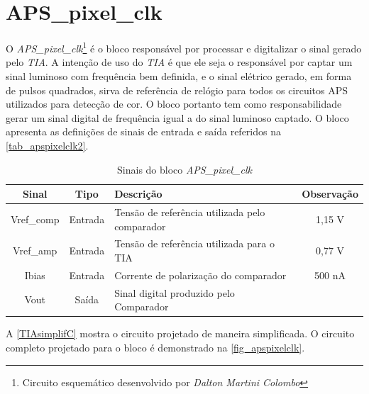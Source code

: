 \renewcommand{\NomeBloco}{\textit{APS\_pixel\_clk}}
\renewcommand{\NomeBlocoNoUnderline}{apspixelclk}
\renewcommand{\NomePTab}{tab_\NomeBlocoNoUnderline}
\renewcommand{\NomeSTab}{tab_\NomeBlocoNoUnderline2}
\renewcommand{\NomePFig}{fig_\NomeBlocoNoUnderline}
\renewcommand{\NomeSFig}{fig_\NomeBlocoNoUnderline2}
\renewcommand{\NomeTTab}{tab_\NomeBlocoNoUnderline3}
\renewcommand{\NomeQTab}{tab_\NomeBlocoNoUnderline4}

\section{APS\_pixel\_clk}

O \NomeBloco{}\footnote{Circuito esquemático desenvolvido por \textit{Dalton Martini Colombo}} \'e o bloco respons\'avel por processar e digitalizar o sinal gerado pelo \textit{TIA}. A intenção de uso do \textit{TIA} \'e que ele seja o respons\'avel por captar um sinal luminoso com frequ\^encia bem definida, e o sinal el\'etrico gerado, em forma de pulsos quadrados, sirva de refer\^encia de rel\'ogio para todos os circuitos APS utilizados para detecção de cor. O bloco portanto tem como responsabilidade gerar um sinal digital de frequ\^encia igual a do sinal luminoso captado. O bloco apresenta as definições de sinais de entrada e sa\'ida referidos na \autoref{\NomeSTab}.

\begin{table}[!h]
\caption{Sinais do bloco \NomeBloco}
\label{\NomeSTab}
\centering
\begin{tabular}{cclc}

    \toprule
    Sinal & Tipo    & Descrição  & Observação\\
    \midrule \midrule
    Vref\_comp   & Entrada   & Tensão de refer\^encia utilizada pelo comparador &  1,15 V\\
    \midrule
    Vref\_amp   & Entrada   & Tensão de refer\^encia utilizada para o TIA &  0,77 V\\
    \midrule
    Ibias   & Entrada   & Corrente de polarização do comparador & 500 nA \\
    \midrule
    Vout   & Saída   & Sinal digital produzido pelo Comparador\\
    \bottomrule
\end{tabular}
\end{table}

A \autoref{TIAsimplifC} mostra o circuito projetado de maneira simplificada. O circuito completo projetado para o bloco \'e demonstrado na \autoref{\NomePFig}.


